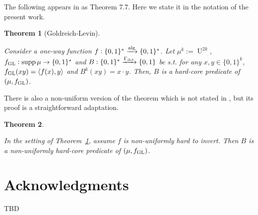 \documentclass{article}
\numberwithin{equation}{section}
\theoremstyle{definition}
\theoremstyle{plain}
\newtheorem{theorem}{Theorem}[section]
\newcommand{\Bool}{\{0,1\}}
\newcommand{\Words}{{\Bool^*}}
\newcommand{\WordsLen}[1]{{\Bool^{#1}}}
\DeclareMathOperator{\Supp}{supp}
\DeclareMathOperator{\U}{U}
\newcommand{\Chev}[1]{\langle #1 \rangle}
\newcommand{\Alg}{\xrightarrow{\textnormal{alg}}}
\begin{document}
The following appears in \cite{Goldreich_2008} as Theorem 7.7. Here we state it in the notation of the present work.

\begin{theorem}[Goldreich-Levin]
\label{thm:goldreich_levin}

Consider a one-way function ${f: \Words \Alg \Words}$. Let $\mu^k:=\U^{2k}$, $f_{\textnormal{GL}}: \Supp \mu \rightarrow \Words$ and ${B: \Words \xrightarrow{\Gamma_{\textnormal{det}}} \Bool}$ be s.t. for any $x,y \in \WordsLen{k}$, $f_{\textnormal{GL}}(xy)=\Chev{f(x),y}$ and ${B^k(xy)=x \cdot y}$. Then, $B$ is a hard-core predicate of $(\mu, f_{\textnormal{GL}})$.

\end{theorem}

There is also a non-uniform version of the theorem which is not stated in \cite{Goldreich_2008}, but its proof is a straightforward adaptation.

\begin{theorem}
\label{thm:goldreich_levin_circ}

In the setting of Theorem~\ref{thm:goldreich_levin}, assume $f$ is non-uniformly hard to invert. Then $B$ is a non-uniformly hard-core predicate of $(\mu, f_{\textnormal{GL}})$.
\end{theorem}

\section*{Acknowledgments}

TBD



\end{document}
